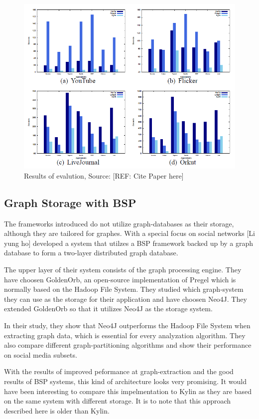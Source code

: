 \documentclass{acm_proc_article-sp}
\begin{document}
\begin{figure}[hbtp]
	\centering
	\includegraphics[scale=0.4]{kylin_results.png}
	\caption{Results of evalution, Source: [REF: Cite Paper here]}
\end{figure}

\subsection{Graph Storage with BSP}

The frameworks introduced do not utilize graph-databases as their storage, although they are tailored for graphes. With a special focus on social networks [Li yung ho] developed a system that utilzes a BSP framework backed up by a graph database to form a two-layer distributed graph database.

The upper layer of their system consists of the graph processing engine. They have choosen GoldenOrb, an open-source implementation of Pregel which is normally based on the Hadoop File System. They studied which graph-system they can use as the storage for their application and have choosen Neo4J. They extended GoldenOrb so that it utilizes Neo4J as the storage system.

In their study, they show that Neo4J outperforms the Hadoop File System when extracting graph data, which is essential for every analyzation algorithm. They also compare different graph-partitioning algorithms and show their performance on social media subsets.

With the results of improved peformance at graph-extraction and the good results of BSP systems, this kind of architecture looks very promising. It would have been interesting to compare this impelmentation to Kylin as they are based on the same system with different storage. It is to note that this approach described here is older than Kylin.
\end{document}
